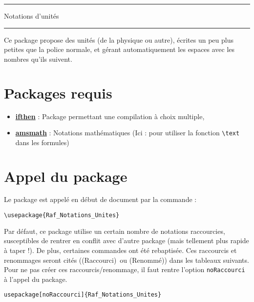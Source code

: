 \documentclass[a4paper,12pt]{article}
\newcommand{\rac}{({\color{red}Raccourci})}
\newcommand{\ren}{({\color{blue}Renommé})}
\begin{document}
	\begin{center}
		\hrule{\Large Notations d'unités}\\\hrule
	\end{center}

	
	Ce package propose des unités (de la physique ou autre),
	écrites un peu plus petites que la police normale,
	et gérant automatiquement les espaces avec les nombres qu'ils suivent.
	
	\tableofcontents
	
	
	
	\section{Packages requis}

	\begin{itemize}
		\item \href{http://www.ctan.org/pkg/ifthen}{\textbf{ifthen}} : Package permettant une compilation à choix multiple,
		\item \href{http://www.ams.org/publications/authors/tex/amslatex}{\textbf{amsmath}} : Notations mathématiques (Ici : pour utiliser la fonction \verb!\text! dans les formules)
	\end{itemize}

	\section{Appel du package}

	Le package est appelé en début de document par la commande :
	\begin{verbatim}
\usepackage{Raf_Notations_Unites}
	\end{verbatim}

	Par défaut, ce package utilise un certain nombre de notations raccourcies, susceptibles de rentrer en conflit avec d'autre package (mais tellement plus rapide à taper !).
	De plus, certaines commandes ont été rebaptisée.
	Ces raccourcis et renommages seront cités (\rac\ ou \ren) dans les tableaux suivants.
	Pour ne pas créer ces raccourcis/renommage, il faut rentre l'option \verb!noRaccourci! à l'appel du package.

	\begin{verbatim}
usepackage[noRaccourci]{Raf_Notations_Unites}
	\end{verbatim}


	
\end{document}
